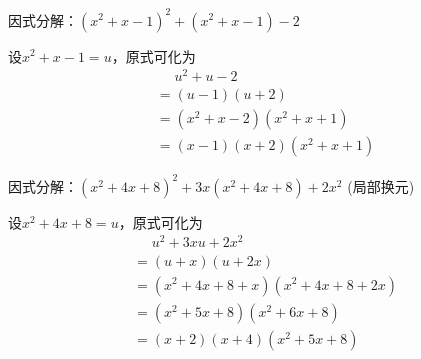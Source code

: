 \documentclass[windows,csize4]{BHCexam}
\begin{document}
\begin{groups}

    \begin{questions}[]
        \question[5]因式分解：$(x^2+x-1)^2+(x^2+x-1)-2$
        \begin{solution}{0.5cm}
            \methodonly 设$x^2+x-1=u$，原式可化为
            \[
                \begin{aligned}
                     & \phantom{=}u^2+u-2   \\
                     & =(u-1)(u+2)          \\
                     & =(x^2+x-2)(x^2+x+1)  \\
                     & =(x-1)(x+2)(x^2+x+1)
                \end{aligned}
            \]
        \end{solution}
        \vspace{4cm}

        \question[5]因式分解：$(x^2+4x+8)^2+3x(x^2+4x+8)+2x^2$ (局部换元)
        \begin{solution}{0.5cm}
            \methodonly 设$x^2+4x+8=u$，原式可化为
            \[
                \begin{aligned}
                     & \phantom{=}u^2+3xu+2x^2    \\
                     & =(u+x)(u+2x)               \\
                     & =(x^2+4x+8+x)(x^2+4x+8+2x) \\
                     & =(x^2+5x+8)(x^2+6x+8)      \\
                     & = (x+2)(x+4)(x^2+5x+8)
                \end{aligned}
            \]
        \end{solution}
        \vspace{4cm}


\end{questions}
\end{groups}
\end{document}
